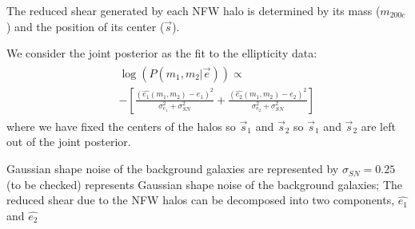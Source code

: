 The reduced shear generated by each NFW halo is determined by its
mass ($m_{200c}$) and the position of its center ($\vec{s}$). 
\par
We consider the joint posterior as the fit to the ellipticity data:
\begin{align}
    &\begin{aligned}
    &\log(P( m_{1}, m_{2} | \vec{e} )) \propto\\
    &-\left[\frac{(\hat{e_1}(m_1, m_2) - e_1)^2
    }{\sigma_{e_1}^2+\sigma_{SN}^2 }+ 
    \frac{(\hat{e_2}(m_1, m_2) - e_2)^2
    }{\sigma_{e_2}^2+\sigma_{SN}^2 }\right] \label{eqn:jointposterior} 
    \end{aligned}
\end{align} 
where we have fixed the centers of the halos so $\vec{s}_1$ and $\vec{s}_2$
so $\vec{s}_1$ and $\vec{s}_2$ are left out of the joint posterior.


Gaussian shape noise of the background galaxies are represented by $\sigma_{SN} = 0.25$(to be checked) represents Gaussian shape noise
of the background galaxies; The reduced shear due to the NFW halos can be
decomposed into two components, $\hat{e_1}$ and $\hat{e_2}$  

